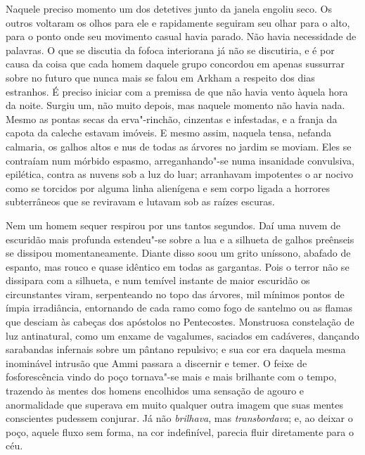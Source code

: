 Naquele preciso momento um dos detetives junto da janela engoliu seco.
Os outros voltaram os olhos para ele e rapidamente seguiram seu olhar
para o alto, para o ponto onde seu movimento casual havia parado. Não
havia necessidade de palavras. O que se discutia da fofoca interiorana
já não se discutiria, e é por causa da coisa que cada homem daquele
grupo concordou em apenas sussurrar sobre no futuro que nunca mais se
falou em Arkham a respeito dos dias estranhos. É preciso iniciar com a
premissa de que não havia vento àquela hora da noite. Surgiu um, não
muito depois, mas naquele momento não havia nada. Mesmo as pontas secas
da erva"-rinchão, cinzentas e infestadas, e a franja da capota da caleche
estavam imóveis. E mesmo assim, naquela tensa, nefanda calmaria, os
galhos altos e nus de todas as árvores no jardim se moviam. Eles se
contraíam num mórbido espasmo, arreganhando"-se numa insanidade
convulsiva, epilética, contra as nuvens sob a luz do luar; arranhavam
impotentes o ar nocivo como se torcidos por alguma linha alienígena e
sem corpo ligada a horrores subterrâneos que se reviravam e lutavam sob
as raízes escuras.

Nem um homem sequer respirou por uns tantos segundos. Daí uma nuvem de
escuridão mais profunda estendeu"-se sobre a lua e a silhueta de galhos
preênseis se dissipou momentaneamente. Diante disso soou um grito
uníssono, abafado de espanto, mas rouco e quase idêntico em todas as
gargantas. Pois o terror não se dissipara com a silhueta, e num temível
instante de maior escuridão os circunstantes viram, serpenteando no topo
das árvores, mil mínimos pontos de ímpia irradiância, entornando de cada
ramo como fogo de santelmo ou as flamas que desciam às cabeças dos
apóstolos no Pentecostes. Monstruosa constelação de luz antinatural,
como um enxame de vagalumes, saciados em cadáveres, dançando sarabandas
infernais sobre um pântano repulsivo; e sua cor era daquela mesma
inominável intrusão que Ammi passara a discernir e temer. O feixe de
fosforescência vindo do poço tornava"-se mais e mais brilhante com o
tempo, trazendo às mentes dos homens encolhidos uma sensação de agouro e
anormalidade que superava em muito qualquer outra imagem que suas mentes
conscientes pudessem conjurar. Já não \emph{brilhava}, mas
\emph{transbordava}; e, ao deixar o poço, aquele fluxo sem forma, na cor
indefinível, parecia fluir diretamente para o céu.

